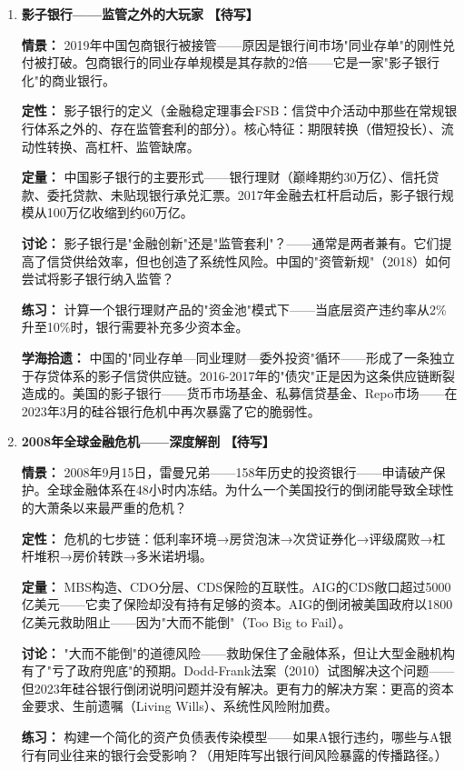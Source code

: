 \documentclass[a4paper,11pt]{ctexart}
\newcommand{\draft}{\textcolor{orange!80!black}{\textbf{【待写】}}}
\begin{document}
\begin{enumerate}

\item[\textbf{第15课}] \textbf{影子银行——监管之外的大玩家} \draft

\textbf{情景：} 2019年中国包商银行被接管——原因是银行间市场"同业存单"的刚性兑付被打破。包商银行的同业存单规模是其存款的2倍——它是一家"影子银行化"的商业银行。

\textbf{定性：} 影子银行的定义（金融稳定理事会FSB：信贷中介活动中那些在常规银行体系之外的、存在监管套利的部分）。核心特征：期限转换（借短投长）、流动性转换、高杠杆、监管缺席。

\textbf{定量：} 中国影子银行的主要形式——银行理财（巅峰期约30万亿）、信托贷款、委托贷款、未贴现银行承兑汇票。2017年金融去杠杆启动后，影子银行规模从100万亿收缩到约60万亿。

\textbf{讨论：} 影子银行是"金融创新"还是"监管套利"？——通常是两者兼有。它们提高了信贷供给效率，但也创造了系统性风险。中国的"资管新规"（2018）如何尝试将影子银行纳入监管？

\textbf{练习：} 计算一个银行理财产品的"资金池"模式下——当底层资产违约率从2\%升至10\%时，银行需要补充多少资本金。

\textbf{学海拾遗：} 中国的"同业存单—同业理财—委外投资"循环——形成了一条独立于存贷体系的影子信贷供应链。2016-2017年的"债灾"正是因为这条供应链断裂造成的。美国的影子银行——货币市场基金、私募信贷基金、Repo市场——在2023年3月的硅谷银行危机中再次暴露了它的脆弱性。

\item[\textbf{第16课}] \textbf{2008年全球金融危机——深度解剖} \draft

\textbf{情景：} 2008年9月15日，雷曼兄弟——158年历史的投资银行——申请破产保护。全球金融体系在48小时内冻结。为什么一个美国投行的倒闭能导致全球性的大萧条以来最严重的危机？

\textbf{定性：} 危机的七步链：低利率环境→房贷泡沫→次贷证券化→评级腐败→杠杆堆积→房价转跌→多米诺坍塌。

\textbf{定量：} MBS构造、CDO分层、CDS保险的互联性。AIG的CDS敞口超过5000亿美元——它卖了保险却没有持有足够的资本。AIG的倒闭被美国政府以1800亿美元救助阻止——因为"大而不能倒"（Too Big to Fail）。

\textbf{讨论：} "大而不能倒"的道德风险——救助保住了金融体系，但让大型金融机构有了"亏了政府兜底"的预期。Dodd-Frank法案（2010）试图解决这个问题——但2023年硅谷银行倒闭说明问题并没有解决。更有力的解决方案：更高的资本金要求、生前遗嘱（Living Wills）、系统性风险附加费。

\textbf{练习：} 构建一个简化的资产负债表传染模型——如果A银行违约，哪些与A银行有同业往来的银行会受影响？（用矩阵写出银行间风险暴露的传播路径。）


\end{enumerate}
\end{document}

